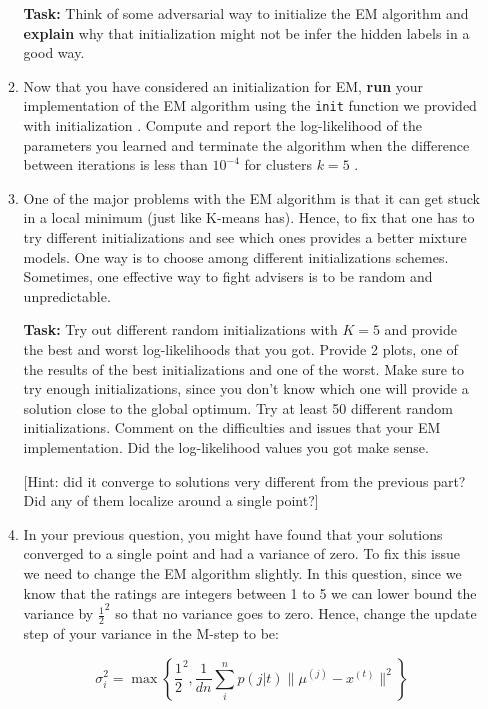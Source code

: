 \begin{enumerate}
\begin{enumerate}
    \textbf{Task:} Think of some adversarial way to initialize the EM algorithm and \textbf{explain} why that initialization might not be infer the hidden labels in a good way.

\item Now that you have considered an initialization for EM, \textbf{run} your implementation of the EM algorithm using the \texttt{init} function we provided with initialization . Compute and report the log-likelihood of the parameters you learned and terminate the algorithm when the difference between iterations is less than $10^{-4}$  for clusters $k=5$ .

\item One of the major problems with the EM algorithm is that it can get stuck in a local minimum (just like K-means has). Hence, to fix that one has to try different initializations and see which ones provides a better mixture models. One way is to choose among different initializations schemes. Sometimes, one effective way to fight advisers is to be random and unpredictable. 

\textbf{Task: } Try out different random initializations  with $K = 5$ and provide the best and worst log-likelihoods that you got. Provide 2 plots, one of the results of the best initializations and one of the worst. Make sure to try enough initializations, since you don't know which one will provide a solution close to the global optimum. Try at least 50 different random initializations. Comment on the difficulties and issues that your EM implementation.  Did the log-likelihood values you got make sense. 

[Hint: did it converge to solutions very different from the previous part? Did any of them localize around a single point?]

\item In your previous question, you might have found that your solutions converged to a single point and had a variance of zero. To fix this issue we need to change the EM algorithm slightly. In this question, since we know that the ratings are integers between 1 to 5 we can lower bound the variance by $\frac{1}{2}^2$ so that no variance goes to zero. Hence, change the update step of your variance in the M-step to be:

$$\sigma^2_i = \max \left\{ \frac{1}{2}^2 , \frac{1}{dn}\sum^n_i p(j | t) \| \mu^{(j)} - x^{(t)} \|^2 \right\}$$


\end{enumerate}
\end{enumerate}
